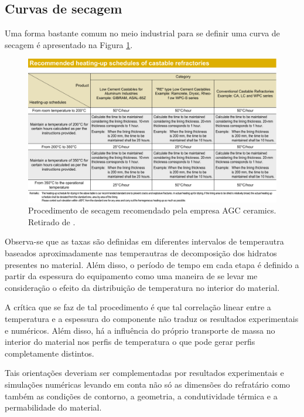     \subsection{Curvas de secagem}
    Uma forma bastante comum no meio industrial para se definir uma curva de
    secagem é apresentado na Figura \ref{fig:industrial_HUC}.

\begin{figure}[ht]
\centering
\includegraphics[width=\linewidth]{./figures/industrial_HUC.pdf}
\caption{Procedimento de secagem recomendado pela empresa AGC ceramics. Retirado de \cite{agc2016}. \label{fig:industrial_HUC}}
\end{figure}

    Observa-se que as taxas são definidas em diferentes intervalos de
    temperautra baseados aproximadamente nas temperautras de decomposição dos
    hidratos presentes no material. Além disso, o período de tempo em cada etapa
    é definido a partir da espessura do equipamento como uma maneira de se levar
    me consideração o efeito da distribuição de temperatura no interior do
    material.

    A crítica que se faz de tal procedimento é que tal correlação linear entre a
    temperatura e a espessura do componente não traduz os resultados
    experimentais e numéricos. Além disso, há a influência do próprio transporte
    de massa no interior do material nos perfis de temperatura o que pode gerar
    perfis completamente distintos.

    Tais orientações deveriam ser complementadas por resultados experimentais e
    simulações numéricas levando em conta não só as dimensões do refratário como
    também as condições de contorno, a geometria, a condutividade térmica e a
    permabilidade do material.

